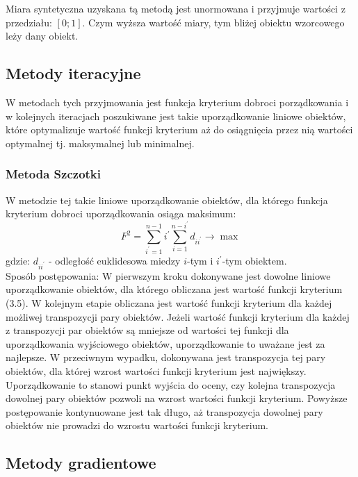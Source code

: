 \documentclass[12pt,a4paper]{report}
\begin{document}
Miara syntetyczna uzyskana tą metodą jest unormowana i przyjmuje wartości z przedziału: $[0;1]$. Czym wyższa wartość miary, tym bliżej obiektu wzorcowego leży dany obiekt. 

\subsection{Metody iteracyjne}
\noindent

W metodach tych przyjmowania jest funkcja kryterium dobroci porządkowania i w kolejnych iteracjach poszukiwane jest takie uporządkowanie liniowe obiektów, które optymalizuje wartość funkcji kryterium aż do osiągnięcia przez nią wartości optymalnej tj. maksymalnej lub minimalnej. 


\subsubsection{Metoda Szczotki}
\noindent

W metodzie tej takie liniowe uporządkowanie obiektów, dla którego funkcja kryterium dobroci uporządkowania osiąga maksimum:
\begin{equation}
F^{2}=\sum_{i^{'}=1}^{n-1} i^{'}\sum_{i=1}^{n-i^{'}} d_{ii^{'}} \rightarrow     \max  
\end{equation}
gdzie:
\newline
$d_{ii^{'}}$ - odległość euklidesowa miedzy $i$-tym i $i^{'}$-tym obiektem.\\
Sposób postępowania:
\newline
W pierwszym kroku dokonywane jest dowolne liniowe uporządkowanie obiektów, dla którego obliczana jest wartość funkcji kryterium (3.5). W kolejnym etapie obliczana jest wartość funkcji kryterium dla każdej możliwej transpozycji pary obiektów. Jeżeli wartość funkcji kryterium dla każdej z transpozycji par obiektów są mniejsze od wartości tej funkcji dla uporządkowania wyjściowego obiektów, uporządkowanie to uważane jest za najlepsze. W przeciwnym wypadku, dokonywana jest transpozycja tej pary obiektów, dla której wzrost wartości funkcji kryterium jest największy. 
\newline
Uporządkowanie to stanowi punkt wyjścia do oceny, czy kolejna transpozycja dowolnej pary obiektów pozwoli na wzrost wartości funkcji kryterium. Powyższe postępowanie kontynuowane jest tak długo, aż transpozycja dowolnej pary obiektów nie prowadzi do wzrostu wartości funkcji kryterium. 

\subsection{Metody gradientowe} %
\noindent
\end{document}
